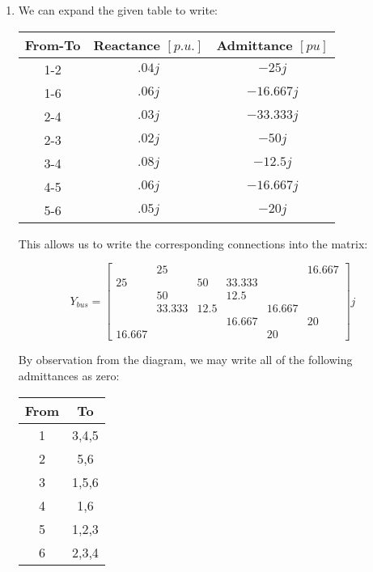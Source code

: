 \begin{enumerate}
  \item

    We can expand the given table to write:

    \begin{center}
      \begin{tabular}[H]{|c|c|c|}
        \hline
        From-To & Reactance $[p.u.]$ & Admittance $[pu]$\\
        \hline
        1-2 & $.04j$ & $-25j$\\
        \hline
        1-6 & $.06j$ & $-16.667j$\\
        \hline
        2-4 & $.03j$ & $-33.333j$\\
        \hline
        2-3 & $.02j$ & $-50j$\\
        \hline
        3-4 & $.08j$ & $-12.5j$\\
        \hline
        4-5 & $.06j$ & $-16.667j$\\
        \hline
        5-6 & $.05j$ & $-20j$\\
        \hline
      \end{tabular}
    \end{center}

    This allows us to write the corresponding connections into the matrix:

    $$Y_{bus}=\left[ \begin{matrix} & 25 & & & & 16.667\\ 25 & & 50 & 33.333 & & \\ & 50 & & 12.5 & & \\ & 33.333 & 12.5 & & 16.667 &\\ & & & 16.667 & & 20\\ 16.667 & & & & 20 &  \end{matrix} \right]j$$

    By observation from the diagram, we may write all of the following admittances as zero:

    \begin{center}
      \begin{tabular}[H]{|c|c|}
        \hline
        From & To\\
        \hline
        1 & 3,4,5\\
        \hline
        2 & 5,6\\
        \hline
        3 & 1,5,6\\
        \hline
        4 & 1,6\\
        \hline
        5 & 1,2,3\\
        \hline
        6 & 2,3,4\\
        \hline
      \end{tabular}
    \end{center}


\end{enumerate}
